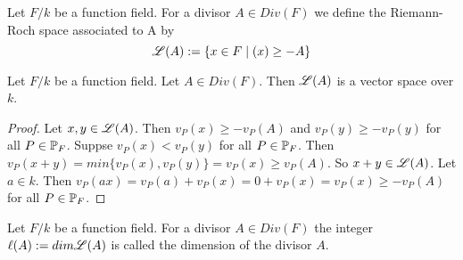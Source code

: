 \begin{definition} \label{RRdef}
	Let $F/k $ be a function field. 
	For a divisor $A \in Div(F)$ we define the Riemann-Roch space 
	associated to A by
	$$ \mathscr{L}(A) := \lbrace x \in F \mid (x) \geq - A \rbrace  $$
\end{definition}

\begin{lemma} \label{RRisVectorSpace}
	Let $F/k $ be a function field.
	Let $A\in Div(F)$. Then 
	$\mathscr{L}(A)$ is a vector space over $k$.
\end{lemma}

\begin{proof}
	Let $x,y \in \mathscr{L}(A)$. Then $v_P(x) \geq - v_P(A) $ and 
	$v_P(y) \geq - v_P(y)  $ for all $P\in \mathbb{P}_F$. Suppse $v_P(x) < v_P(y)$
	for all $P \in \mathbb{P}_F$. Then
	$v_P(x+y) = min \lbrace v_P(x),v_P(y) \rbrace  = v_P(x) \geq v_P(A)$. 
	So $x + y \in \mathscr{L}(A)$. Let $a\in k$. 
	Then $v_P(ax) = v_P(a) + v_P(x) = 0 + v_P(x) = v_P(x) \geq - v_P(A)$
	for all $P\in \mathbb{P}_F$.
\end{proof}

\begin{definition}
	Let $F/k $ be a function field. 
	For a divisor $A \in Div(F)$ the integer $ \ell (A) := dim \mathscr{L} (A) $ 
	is called the dimension of the divisor $A$.
\end{definition}

